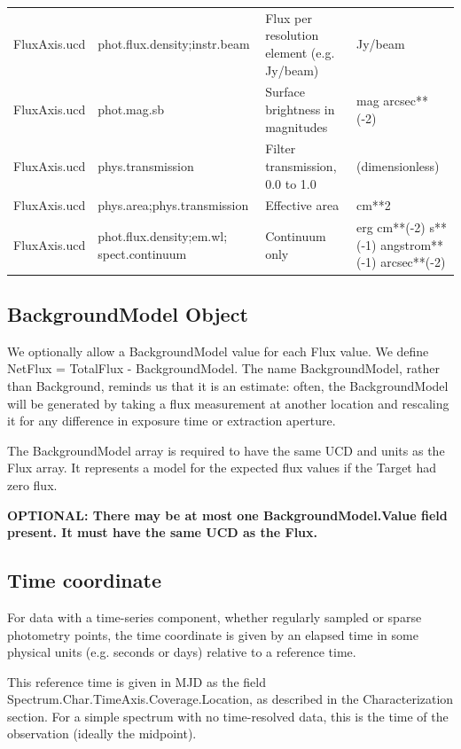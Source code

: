 \documentclass[11pt]{article}
\newcommand{\photfluxucd}{phot.flux.density}
\newcommand{\hdebug}{}
\begin{document}
\begin{flushleft}
{\begin{minipage}[l]{7.0in}
\begin{tabular}{lp{1.5in}p{1.6in}p{2.2in}}
 FluxAxis.ucd &   \photfluxucd;instr.beam &  Flux per resolution element (e.g. Jy/beam) &Jy/beam \\
 FluxAxis.ucd &   phot.mag.sb  &  Surface brightness in magnitudes &mag arcsec**(-2)\\
  FluxAxis.ucd &   phys.transmission & Filter transmission, 0.0 to 1.0 &  (dimensionless)\\
 FluxAxis.ucd &   phys.area;phys.transmission & Effective area & cm**2\\
 FluxAxis.ucd & \photfluxucd;em.wl; spect.continuum &  Continuum only &
erg cm**(-2) s**(-1) angstrom**(-1) arcsec**(-2)\\
\end{tabular}
\end{minipage}
}
\end{flushleft}

\hdebug
 
\subsection{BackgroundModel Object}

We optionally allow a BackgroundModel value for each Flux value.
We define NetFlux = TotalFlux - BackgroundModel.
The name BackgroundModel,
rather than Background, reminds us that it is an estimate:
often, the BackgroundModel will be generated by taking a flux measurement
at another location and rescaling it for any difference in exposure time or 
extraction aperture.
 
The BackgroundModel array is required to have the same UCD and units as
the Flux array. It represents a model for the expected flux values
if the Target had zero flux.
  
{\bf  OPTIONAL: There may be at most one BackgroundModel.Value
field present. It must have the same UCD as the Flux.
} 


\subsection{Time coordinate}

For data with a time-series component, whether regularly sampled or
sparse photometry points, the time coordinate is given by an elapsed
time in some physical units (e.g. seconds or days) relative to a
reference time. 

This reference time is given in MJD as the field Spectrum.Char.TimeAxis.Coverage.Location,
as described in the Characterization section. For a simple spectrum
with no time-resolved data, this is the time of the observation (ideally
the midpoint).
\end{document}
